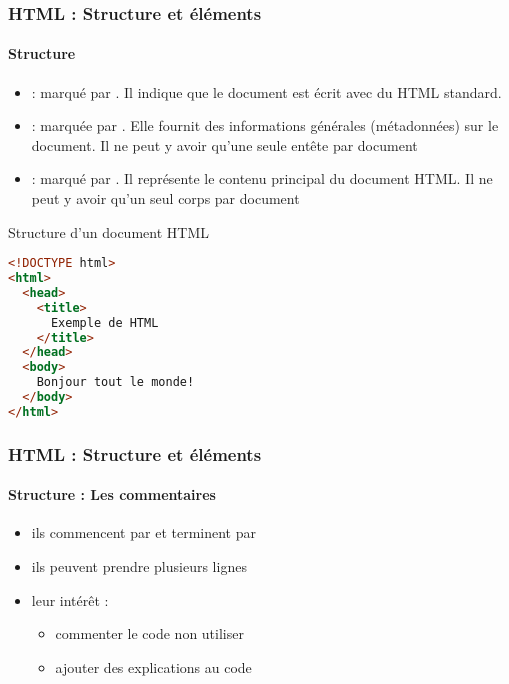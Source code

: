\documentclass[xcolor=table]{beamer}
\begin{document}
\begin{frame}[fragile]
\frametitle{HTML : Structure et éléments}
\framesubtitle{Structure}

\begin{minipage}{0.60\textwidth} 
\begin{itemize}
	\item {} : marqué par . Il indique que le document est écrit avec du HTML standard.
	\item {} : marquée par . Elle fournit des informations générales (métadonnées) sur le document. Il ne peut y avoir qu'une seule entête par document
	\item {} : marqué par . Il représente le contenu principal du document HTML. Il ne peut y avoir qu'un seul corps par document
\end{itemize}
\end{minipage}
%
\begin{minipage}{0.38\textwidth}
\begin{block}{Structure d'un document HTML}
\lstset{escapeinside=**}
\scriptsize\bfseries
\begin{lstlisting}[language={html}]
<!DOCTYPE html>
<html>
  <head>
    <title>
      Exemple de HTML
    </title>
  </head>
  <body>
    Bonjour tout le monde!
  </body>
</html>
\end{lstlisting}
\end{block}
\end{minipage}

\end{frame}

\begin{frame}
\frametitle{HTML : Structure et éléments}
\framesubtitle{Structure : Les commentaires}

\begin{itemize}
	\item ils commencent par \keyword{<!- -} et terminent par \keyword{- ->}
	\item ils peuvent prendre plusieurs lignes
	\item leur intérêt : 
	\begin{itemize}
		\item commenter le code non utiliser
		\item ajouter des explications au code
	\end{itemize}
\end{itemize}

\end{frame}
\end{document}

